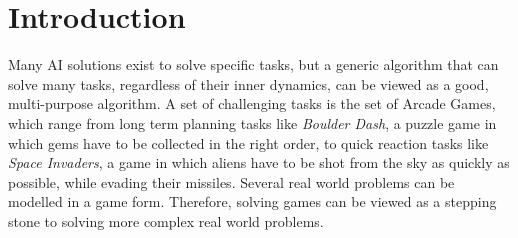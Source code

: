 \chapter{Introduction}
\label{chap:introduction}
Many AI solutions exist to solve specific tasks, but a generic algorithm
that can solve many tasks, regardless of their inner dynamics, can be viewed as
a good, multi-purpose algorithm. A set of challenging tasks is the set of Arcade
Games, which range from long term planning tasks like \emph{Boulder Dash}, a
puzzle game in which gems have to be collected in the right order, to quick
reaction tasks like \emph{Space Invaders}, a game in which aliens have to be
shot from the sky as quickly as possible, while evading their missiles. Several
real world problems can be modelled in a game form. Therefore, solving games can
be viewed as a stepping stone to solving more complex real world problems. 


